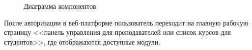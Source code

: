 \begin{figure}[ht]
\caption{Диаграмма компонентов}
\label{comp:image}
\end{figure}

После авторизации в веб-платформе пользователь переходит на главную рабочую страницу <<панель управления для преподавателей или список курсов для студентов>>,  где отображаются доступные модули.

